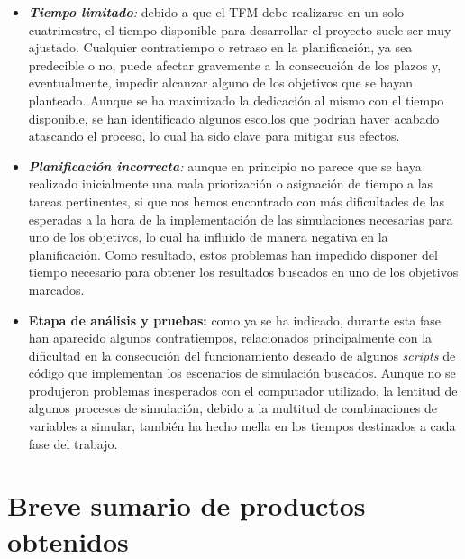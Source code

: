 \documentclass[IB,BIB]{TFUOC}%
\begin{document}
\begin{itemize}
\item \textit{\textbf{Tiempo limitado}:} debido a que el TFM debe realizarse en un solo cuatrimestre, el tiempo disponible para desarrollar el proyecto suele ser muy ajustado. Cualquier contratiempo o retraso en la planificación, ya sea predecible o no, puede afectar gravemente a la consecución de los plazos y, eventualmente, impedir alcanzar alguno de los objetivos que se hayan planteado. Aunque se ha maximizado la dedicación al mismo con el tiempo disponible, se han identificado algunos escollos que podrían haver acabado atascando el proceso, lo cual ha sido clave para mitigar sus efectos.
\item \textit{\textbf{Planificación incorrecta}:} aunque en principio no parece que se haya realizado inicialmente una mala priorización o asignación de tiempo a las tareas pertinentes, si que nos hemos encontrado con más dificultades de las esperadas a la hora de la implementación de las simulaciones necesarias para uno de los objetivos, lo cual ha influido de manera negativa en la planificación. Como resultado, estos problemas han impedido disponer del tiempo necesario para obtener los resultados buscados en uno de los objetivos marcados.
\item \textbf{Etapa de análisis y pruebas:} como ya se ha indicado, durante esta fase han aparecido algunos contratiempos, relacionados principalmente con la dificultad en la consecución del funcionamiento deseado de algunos \textit{scripts} de código que implementan los escenarios de simulación buscados. Aunque no se produjeron problemas inesperados con el computador utilizado, la lentitud de algunos procesos de simulación, debido a la multitud de combinaciones de variables a simular, también ha hecho mella en los tiempos destinados a cada fase del trabajo.
\end{itemize}

\normalsize


\section{Breve sumario de productos obtenidos}
\label{sec:Breve sumario de productos obtenidos}


\end{document}
